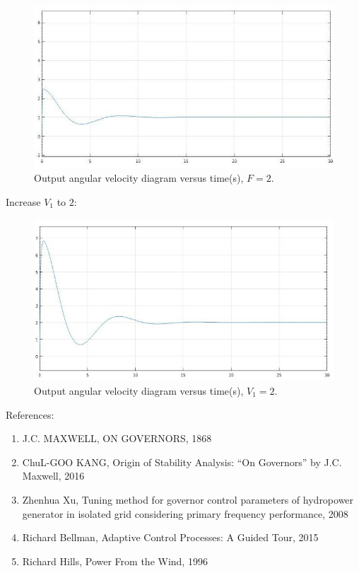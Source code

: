 \documentclass[11pt]{scrartcl} %
\begin{document}
\begin{figure}[h] 
	\centering
	\includegraphics[width=0.55\columnwidth]{images/p14.jpg}
	\caption{Output angular velocity diagram versus time(s), $F = 2$.}
\end{figure}
\newpage Increase $V_1$ to $2$:
\begin{figure}[h] 
	\centering
	\includegraphics[width=0.55\columnwidth]{images/p15.jpg}
	\caption{Output angular velocity diagram versus time(s), $V_1 = 2$.}
\end{figure}

\newpage

{\huge References:}
\begin{enumerate}
	\item J.C. MAXWELL, ON GOVERNORS, 1868
	\item ChuL-GOO KANG, Origin of Stability Analysis: “On Governors” by J.C. Maxwell, 2016
	\item Zhenhua Xu, Tuning method for governor control parameters of hydropower generator in isolated grid considering primary frequency performance, 2008
	\item Richard Bellman,  Adaptive Control Processes: A Guided Tour, 2015
	\item Richard Hills, Power From the Wind, 1996
\end{enumerate}
\end{document}
